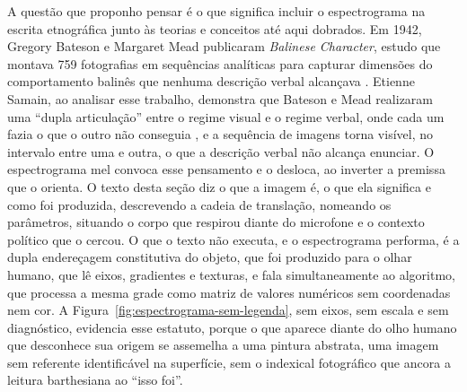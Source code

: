 A questão que proponho pensar é o que significa incluir o espectrograma na escrita etnográfica junto às teorias e conceitos até aqui dobrados. Em 1942, Gregory Bateson e Margaret Mead publicaram \textit{Balinese Character}, estudo que montava 759 fotografias em sequências analíticas para capturar dimensões do comportamento balinês que nenhuma descrição verbal alcançava \parencite{BatesonMead1942}. Etienne Samain, ao analisar esse trabalho, demonstra que Bateson e Mead realizaram uma \enquote{dupla articulação} entre o regime visual e o regime verbal, onde cada um fazia o que o outro não conseguia \parencite{Samain2000Balinese}, e a sequência de imagens torna visível, no intervalo entre uma e outra, o que a descrição verbal não alcança enunciar. O espectrograma mel convoca esse pensamento e o desloca, ao inverter a premissa que o orienta. O texto desta seção diz o que a imagem é, o que ela significa e como foi produzida, descrevendo a cadeia de translação, nomeando os parâmetros, situando o corpo que respirou diante do microfone e o contexto político que o cercou. O que o texto não executa, e o espectrograma performa, é a dupla endereçagem constitutiva do objeto, que foi produzido para o olhar humano, que lê eixos, gradientes e texturas, e fala simultaneamente ao algoritmo, que processa a mesma grade como matriz de valores numéricos sem coordenadas nem cor. A Figura~\ref{fig:espectrograma-sem-legenda}, sem eixos, sem escala e sem diagnóstico, evidencia esse estatuto, porque o que aparece diante do olho humano que desconhece sua origem se assemelha a uma pintura abstrata, uma imagem sem referente identificável na superfície, sem o indexical fotográfico que ancora a leitura barthesiana ao \enquote{isso foi}.

